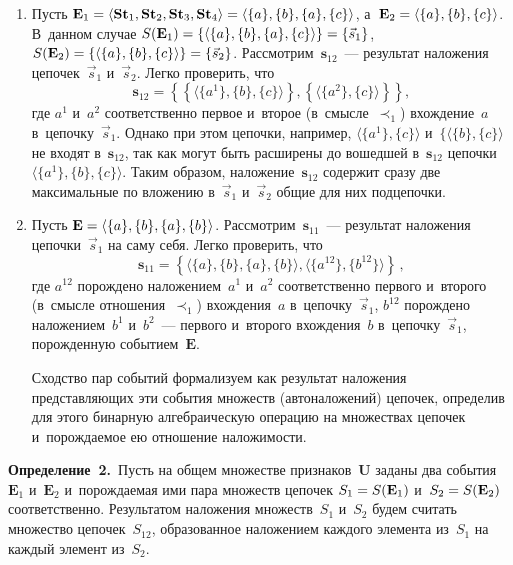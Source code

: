 \begin{multicols}{2}
  \begin{enumerate}
\item Пусть $\mathbf{E}_1 \hm= \langle \mathbf{St}_1, \mathbf{St}_2, 
\mathbf{St}_3, \mathbf{St}_4\rangle \hm = \langle \{a\},\{b\},\linebreak \{a\},\{c\}\rangle$, 
а~$\mathbf{E}_2\hm = \langle \{a\},\{b\},\{c\}\rangle$. В~данном случае 
$S(\mathbf{E}_1) \hm= \{\langle \{a\},\{b\},\{a\},\{c\}\rangle\} \hm= 
\{\vec{s}_1\}$, $S(\mathbf{E}_2) \hm= \{\langle \{a\},\{b\},\{c\}\rangle\} \hm= 
\{\vec{s}_2\}$. Рассмотрим~$\mathbf{s}_{12}$~--- результат наложения 
цепочек~$\vec{s}_1$ и~$\vec{s}_2$. Легко проверить, что
  $$
\mathbf{s}_{12} =\left\{\left\{ \langle \{a^1\},\{b\},\{c\}\rangle\right\}, 
\left\{\langle \{a^2\},\{c\}\rangle\right\}\right\},
$$
где $a^1$ и~$a^2$ соответственно первое и~второе (в~смыс\-ле~$\prec_1$) 
вхож\-де\-ние~$a$ в~цепочку~$\vec{s}_1$. Однако при этом цепочки, например, 
$\langle \{a^1\},\{c\}\rangle$ и~$\{\langle \{b\},\{c\}\rangle$ не входят 
в~$\mathbf{s}_{12}$, так как могут быть расширены до вошедшей 
в~$\mathbf{s}_{12}$ цепочки $\langle \{a^1\},\{b\},\{c\}\rangle$. Таким образом, 
наложение~$\mathbf{s}_{12}$ содержит сразу две максимальные по вложению 
в~$\vec{s}_1$ и~$\vec{s}_2$ общие для них подцепочки.
 
 \item Пусть $\mathbf{E}\hm = \langle\{a\},\{b\},\{a\},\{b\}\rangle$. 
Рас\-смот\-рим~$\mathbf{s}_{11}$~--- результат наложения цепочки~$\vec{s}_1$ на 
саму себя. Легко проверить, что
  $$
  \mathbf{s}_{11} = \left\{\langle \{a\},\{b\},\{a\},\{b\}\rangle, \langle 
\{a^{12}\},\{b^{12}\}\rangle\right\}\,,
  $$
где $a^{12}$ порождено наложением~$a^1$ и~$a^2$ соответственно первого 
и~второго (в~смысле отношения~$\prec_1$) вхож\-де\-ния~$a$ 
в~цепочку~$\vec{s}_1$, $b^{12}$ по\-рож\-де\-но наложением~$b^1$ и~$b^2$~--- 
первого и~второго вхождения~$b$ в~цепочку~$\vec{s}_1$, по\-рож\-ден\-ную 
событием~$\mathbf{E}$.
  
  Сходство пар событий формализуем как результат наложения 
пред\-став\-ля\-ющих эти события множеств (автоналожений) цепочек, определив 
для этого бинарную алгебраическую операцию на множествах цепочек 
и~по\-рож\-да\-емое ею отношение на\-ло\-жи\-мости.
  
  \end{enumerate}
  
  \noindent
  \textbf{Определение~2.}\ Пусть на общем множестве признаков~$\mathbf{U}$ 
заданы два события~$\mathbf{E}_1$ и~$\mathbf{E}_2$ и~порождаемая ими пара 
множеств цепочек $S_1 \hm= S(\mathbf{E}_1)$ и~$S_2 \hm= S(\mathbf{E}_2)$ 
соответственно. Результатом наложения множеств~$S_1$ и~$S_2$ будем считать 
множество цепочек~$S_{12}$, образованное наложением каждого элемента 
из~$S_1$ на каждый элемент из~$S_2$.
  

\end{multicols}
